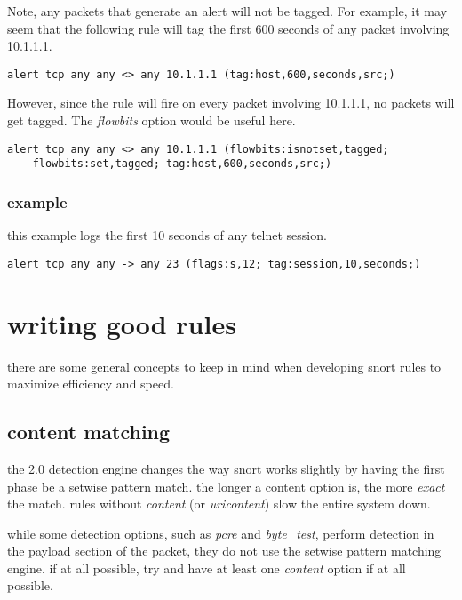 \documentclass[english]{report}
\begin{document}
Note, any packets that generate an alert will not be tagged.  For example, it may seem that the following rule will tag the first 600 seconds of any packet involving 10.1.1.1.
\begin{verbatim}
alert tcp any any <> any 10.1.1.1 (tag:host,600,seconds,src;)
\end{verbatim}

However, since the rule will fire on every packet involving 10.1.1.1, no packets will get tagged.  The \emph{flowbits} option would be useful here.

\begin{verbatim}
alert tcp any any <> any 10.1.1.1 (flowbits:isnotset,tagged; 
    flowbits:set,tagged; tag:host,600,seconds,src;)
\end{verbatim}

\subsubsection{example}

this example logs the first 10 seconds of any telnet session.
\begin{verbatim}
alert tcp any any -> any 23 (flags:s,12; tag:session,10,seconds;)
\end{verbatim}







\newpage
\section{writing good rules}

there are some general concepts to keep in mind when developing snort
rules to maximize efficiency and speed.

\subsection{content matching}
the 2.0 detection engine changes the way snort works slightly by having the
first phase be a setwise pattern match.  the longer a content option is, the
more \emph{exact} the match.  rules without \emph{content} (or
\emph{uricontent}) slow the entire system down.

while some detection options, such as \emph{pcre} and \emph{byte\_test},
perform detection in the payload section of the packet, they do not use the
setwise pattern matching engine.  if at all possible, try and have at least one
\emph{content} option if at all possible.
\end{document}

